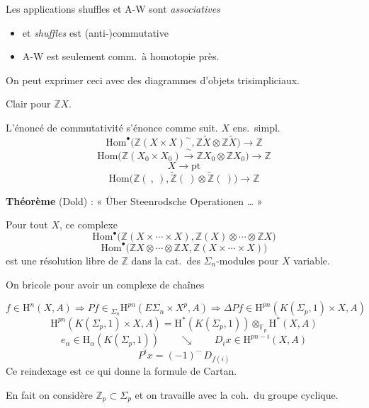 \documentclass[11pt,a4paper]{article}
\begin{document}

Les applications shuffles et A-W sont \emph{associatives}
\begin{itemize}
\item et \emph{shuffles} est (anti-)commutative
\item A-W est seulement comm.\ à homotopie près.
\end{itemize}
On peut exprimer ceci avec des diagrammes d’objets trisimpliciaux.


Clair pour $\mathbb{Z}X$.
\struck{\ill{}}

L’énoncé de commutativité s’énonce comme suit. $X$ ens.\ simpl.
\[
\mathrm{Hom}^\bullet\bigl( \mathbb{Z}(X \times X)^\sim , \mathbb{Z}\widetilde{X} \otimes \mathbb{Z}\widetilde{X} \bigr) \longrightarrow \mathbb{Z}
\]
\[
\mathrm{Hom}\bigl( \mathbb{Z}(X_0 \times X_0) \xrightarrow{\;\sim\;} \mathbb{Z}X_0 \otimes \mathbb{Z}X_0 \bigr) \longrightarrow \mathbb{Z}
\]
\[
X \longrightarrow \mathrm{pt}
\]
\[
\mathrm{Hom}\bigl( \mathbb{Z}(\ ,\ ) , \widetilde{\mathbb{Z}}(\ ) \otimes \widetilde{\mathbb{Z}}(\ ) \bigr) \longrightarrow \mathbb{Z}
\]

\textbf{Théorème} (Dold) : « Über Steenrodsche Operationen … »

Pour tout $X$, ce complexe
\[
\mathrm{Hom}^\bullet\bigl( \mathbb{Z}(X \times \cdots \times X) , \mathbb{Z}(X) \otimes \cdots \otimes \mathbb{Z}X \bigr)
\]
\[
\mathrm{Hom}^\bullet\bigl( \mathbb{Z}X \otimes \cdots \otimes \mathbb{Z}X , \mathbb{Z}(X \times \cdots \times X) \bigr)
\]
est une résolution libre de $\mathbb{Z}$ dans la cat.\ des $\Sigma_n$-modules pour $X$ variable.

On bricole pour avoir un complexe de chaînes

\[
f \in \mathrm{H}^n(X , A) \Longrightarrow Pf \in {}_{\Sigma_n}\mathrm{H}^{pn}(E\Sigma_n \times X^p , A)
\Longrightarrow \Delta Pf \in \mathrm{H}^{pn}(K(\Sigma_p , 1) \times X , A)
\]
\[
\mathrm{H}^{pn}(K(\Sigma_p , 1) \times X , A) = \mathrm{H}^*(K(\Sigma_p , 1)) \otimes_{\mathbb{F}_p} \mathrm{H}^*(X , A)
\]
\struck{\ill{}}
\[
e_\alpha \in \mathrm{H}_\alpha(K(\Sigma_p , 1))
\qquad \searrow \qquad
D_i x \in \mathrm{H}^{pn-i}(X , A)
\]
\[
P^i x = (-1)^{\cdots} \, D_{f(i)}
\]
Ce reindexage est ce qui donne la formule de Cartan.

En fait on considère $\mathbb{Z}_p \subset \Sigma_p$ et on travaille avec la coh.\ du groupe cyclique.
\end{document}
